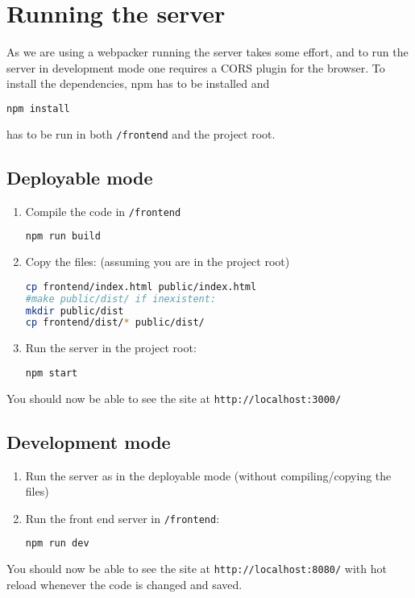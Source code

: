 \documentclass[a4paper]{article}
\begin{document}
\section{Running the server}
As we are using a webpacker running the server takes some effort, and to run the server in development mode one requires a CORS plugin for the browser. To install the dependencies, npm has to be installed and
\begin{lstlisting}[language=bash]
npm install
\end{lstlisting}
has to be run in both \texttt{/frontend} and the project root.

\subsection{Deployable mode}
\begin{enumerate}
\item Compile the code in \texttt{/frontend}
\begin{lstlisting}[language=bash]
npm run build
\end{lstlisting}
\item Copy the files: (assuming you are in the project root)
\begin{lstlisting}[language=bash]
cp frontend/index.html public/index.html
#make public/dist/ if inexistent:
mkdir public/dist
cp frontend/dist/* public/dist/
\end{lstlisting} 
\item Run the server in the project root:
\begin{lstlisting}[language=bash]
npm start
\end{lstlisting}
\end{enumerate}
You should now be able to see the site at \texttt{http://localhost:3000/}
\subsection{Development mode}
\begin{enumerate}
\item Run the server as in the deployable mode (without compiling/copying the files)
\item Run the front end server in \texttt{/frontend}:
\begin{lstlisting}[language=bash]
npm run dev
\end{lstlisting}
\end{enumerate}
You should now be able to see the site at \texttt{http://localhost:8080/} with hot reload whenever the code is changed and saved.
\end{document}
